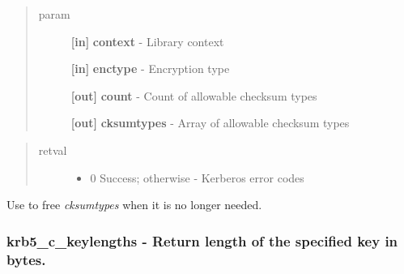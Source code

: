 \documentclass[letterpaper,10pt,english]{sphinxmanual}
\begin{document}
\begin{quote}\begin{description}
\item[{param}] \leavevmode
\textbf{{[}in{]}} \textbf{context} - Library context

\textbf{{[}in{]}} \textbf{enctype} - Encryption type

\textbf{{[}out{]}} \textbf{count} - Count of allowable checksum types

\textbf{{[}out{]}} \textbf{cksumtypes} - Array of allowable checksum types

\end{description}\end{quote}
\begin{quote}\begin{description}
\item[{retval}] \leavevmode\begin{itemize}
\item {} 
0   Success; otherwise - Kerberos error codes

\end{itemize}

\end{description}\end{quote}

Use {\hyperref[appdev/refs/api/krb5_free_cksumtypes:c.krb5_free_cksumtypes]{}} to free \emph{cksumtypes} when it is no longer needed.


\subsubsection{krb5\_c\_keylengths -  Return length of the specified key in bytes.}
\label{appdev/refs/api/krb5_c_keylengths::doc}\label{appdev/refs/api/krb5_c_keylengths:krb5-c-keylengths-return-length-of-the-specified-key-in-bytes}

\begin{fulllineitems}
\label{appdev/refs/api/krb5_c_keylengths:c.krb5_c_keylengths}
\end{fulllineitems}
\end{document}
